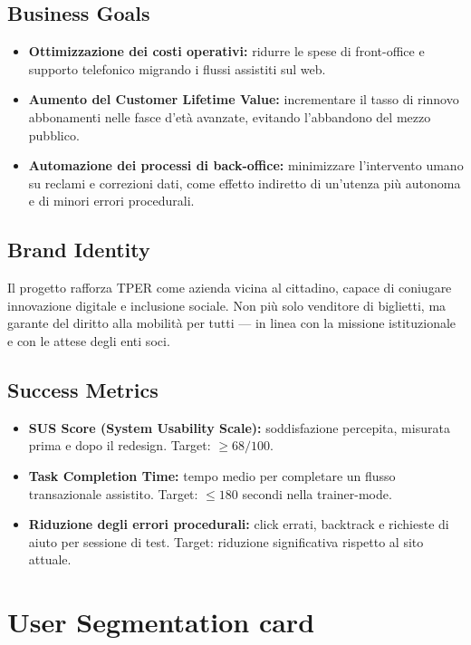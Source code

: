 \documentclass[11pt,a4paper]{article}
\begin{document}
\subsection{Business Goals}
\begin{itemize}[leftmargin=*]
\item \textbf{Ottimizzazione dei costi operativi:} ridurre le spese di
front-office e supporto telefonico migrando i flussi assistiti sul web.
\item \textbf{Aumento del Customer Lifetime Value:} incrementare il tasso
di rinnovo abbonamenti nelle fasce d'età avanzate, evitando l'abbandono
del mezzo pubblico.
\item \textbf{Automazione dei processi di back-office:} minimizzare
l'intervento umano su reclami e correzioni dati, come effetto indiretto
di un'utenza più autonoma e di minori errori procedurali.
\end{itemize}

\subsection{Brand Identity}
Il progetto rafforza TPER come azienda vicina al cittadino, capace di
coniugare innovazione digitale e inclusione sociale. Non più solo venditore
di biglietti, ma garante del diritto alla mobilità per tutti --- in linea con
la missione istituzionale e con le attese degli enti soci.

\subsection{Success Metrics}
\begin{itemize}[leftmargin=*]
    \item \textbf{SUS Score (System Usability Scale):}
    soddisfazione percepita, misurata prima e dopo il redesign.
    Target: $\geq 68/100$.

    \item \textbf{Task Completion Time:}
    tempo medio per completare un flusso transazionale assistito.
    Target: $\leq 180$ secondi nella trainer-mode.

    \item \textbf{Riduzione degli errori procedurali:}
    click errati, backtrack e richieste di aiuto per sessione di test.
    Target: riduzione significativa rispetto al sito attuale.
\end{itemize}

\newpage
\section{User Segmentation card}
\end{document}
